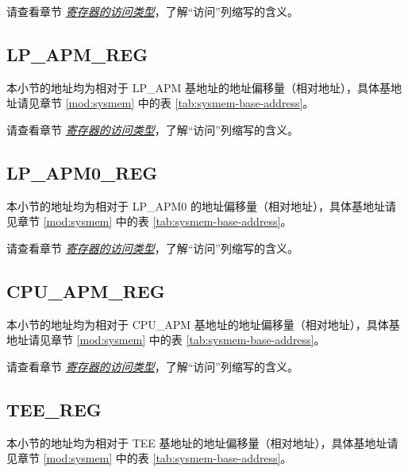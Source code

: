 \documentclass[main\_\_CN.tex]{subfiles}
\begin{document}
请查看章节 \hyperref[glossary-access-types]{\textit{寄存器的访问类型}}，了解“访问”列缩写的含义。



\subsection{LP\_APM\_REG}
\label{sec:permctrl-reg-lp}

本小节的地址均为相对于 LP\_APM 基地址的地址偏移量（相对地址），具体基地址请见章节 \ref{mod:sysmem} \textit{} 中的表 \ref{tab:sysmem-base-address}。

请查看章节 \hyperref[glossary-access-types]{\textit{寄存器的访问类型}}，了解“访问”列缩写的含义。



\subsection{LP\_APM0\_REG}\label{sec:permctrl-reg-lp0}

本小节的地址均为相对于 LP\_APM0 的地址偏移量（相对地址），具体基地址请见章节 \ref{mod:sysmem} \textit{} 中的表 \ref{tab:sysmem-base-address}。

请查看章节 \hyperref[glossary-access-types]{\textit{寄存器的访问类型}}，了解“访问”列缩写的含义。



\subsection{CPU\_APM\_REG}
\label{sec:permctrl-reg-cpu}

本小节的地址均为相对于 CPU\_APM 基地址的地址偏移量（相对地址），具体基地址请见章节 \ref{mod:sysmem} \textit{} 中的表 \ref{tab:sysmem-base-address}。

请查看章节 \hyperref[glossary-access-types]{\textit{寄存器的访问类型}}，了解“访问”列缩写的含义。



\subsection{TEE\_REG}
\label{sec:permctrl-reg-hp-tee}

本小节的地址均为相对于 TEE 基地址的地址偏移量（相对地址），具体基地址请见章节 \ref{mod:sysmem} \textit{} 中的表 \ref{tab:sysmem-base-address}。
\end{document}
